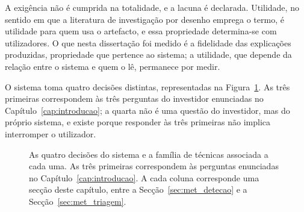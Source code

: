 A exigência não é cumprida na totalidade, e a lacuna é declarada. Utilidade, no sentido em que a
literatura de investigação por desenho emprega o termo, é utilidade para quem usa o artefacto, e
essa propriedade determina-se com utilizadores. O que nesta dissertação foi medido é a fidelidade
das explicações produzidas, propriedade que pertence ao sistema; a utilidade, que depende da
relação entre o sistema e quem o lê, permanece por medir.

O sistema toma quatro decisões distintas, representadas na Figura~\ref{fig:met_decisoes}. As três
primeiras correspondem às três perguntas do investidor enunciadas no Capítulo~\ref{cap:introducao}; a quarta não é uma
questão do investidor, mas do próprio sistema, e existe porque responder às três primeiras não
implica interromper o utilizador.

\begin{figure}[htbp]
\centering
{}
\caption[As quatro decisões do sistema]{As quatro decisões do sistema e a família de técnicas
associada a cada uma. As três primeiras correspondem às perguntas enunciadas no
Capítulo~\ref{cap:introducao}. A cada coluna corresponde uma secção deste capítulo, entre a
Secção~\ref{sec:met_detecao} e a Secção~\ref{sec:met_triagem}.}
\label{fig:met_decisoes}
\end{figure}


